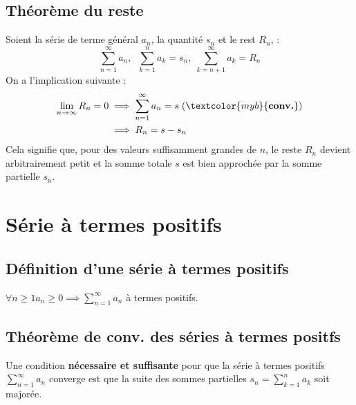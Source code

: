 \documentclass{report}
\begin{document}
\begin{multicols*}{3}
    \section{Théorème du reste}

        Soient la série de terme général $a_n$, la quantité $s_n$ et le rest $R_n$, :
        \[%
        \sum_{n=1}^{\infty }a_n, \;\;
        \sum_{k=1}^{n }a_k = s_n, \; \sum_{k= n+1}^{\infty }a_k = R_n
        \]%
        On a l'implication suivante :
        \begin{align*}
            \lim\limits_{n\to\infty }R_n = 0 
            &\implies \sum_{n=1}^{\infty }a_n = s \; (\textcolor{myb}{\textbf{conv.}})  \\
            &\implies R_n = s - s_n 
        \end{align*}
        Cela signifie que, pour des valeurs suffisamment grandes de \(n\), 
        le reste \(R_n\) devient 
        arbitrairement petit et la somme totale \(s\) est bien approchée 
        par la somme partielle \(s_n\).    


\chapter{Série à termes positifs}


    \section{Définition d'une série à termes positifs}
    \noindent$\forall n \geq 1 a_n \geq 0 \implies \sum_{n=1}^{\infty }a_n$ à termes positifs.

    \section{Théorème de conv. des séries à termes positfs}
    Une condition \textbf{nécessaire et suffisante} pour que la série à termes positifs 
        $\sum_{n=1}^{\infty }a_n$ converge est que la suite des sommes partielles
        $s_n = \sum_{k=1}^{n }a_k$ soit majorée. 
        \\\\ 


\end{multicols*}
\end{document}
